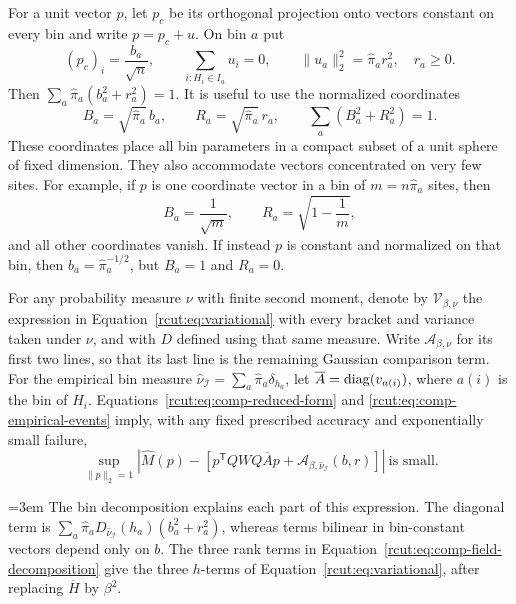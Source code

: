 For a unit vector $p$, let $p_c$ be its orthogonal projection onto
vectors constant on every bin and write $p=p_c+u$.  On bin $a$ put
\begin{equation}
 (p_c)_i=\frac{b_a}{\sqrt n},\qquad
 \sum_{i:H_i\in I_a}u_i=0,\qquad
 \|u_a\|_2^2=\widehat\pi_a r_a^2,
 \quad r_a\ge0.
 \label{rcut:eq:comp-bin-decomposition}
\end{equation}
Then
$\sum_a\widehat\pi_a(b_a^2+r_a^2)=1$.
It is useful to use the normalized coordinates
\begin{equation}
 B_a=\sqrt{\widehat\pi_a}\,b_a,
 \qquad R_a=\sqrt{\widehat\pi_a}\,r_a,
 \qquad \sum_a(B_a^2+R_a^2)=1.
 \label{rcut:eq:comp-normalized-parameters}
\end{equation}
These coordinates place all bin parameters in a compact subset of a
unit sphere of fixed dimension.  They also accommodate vectors
concentrated on very few sites.  For example, if $p$ is one coordinate
vector in a bin of $m=n\widehat\pi_a$ sites, then
\[
 B_a=\frac1{\sqrt m},\qquad R_a=\sqrt{1-\frac1m},
\]
and all other coordinates vanish.  If instead $p$ is constant and
normalized on that bin, then $b_a=\widehat\pi_a^{-1/2}$, but
$B_a=1$ and $R_a=0$.

For any probability measure $\nu$ with finite second moment, denote
by $\mathcal V_{\beta,\nu}$ the expression in
Equation~\eqref{rcut:eq:variational} with every bracket and variance
taken under $\nu$, and with $D$ defined using that same measure.
Write $\mathcal A_{\beta,\nu}$ for its first two lines, so that its
last line is the remaining Gaussian comparison term.
For the empirical bin measure
$\widehat\nu_{\mathcal I}=\sum_a\widehat\pi_a\delta_{h_a}$,
let $\overline A=\operatorname{diag}(v_{a(i)})$, where $a(i)$ is the bin of $H_i$.
Equations~\eqref{rcut:eq:comp-reduced-form} and
\eqref{rcut:eq:comp-empirical-events} imply, with any fixed prescribed
accuracy and exponentially small failure,
\begin{equation}
 \sup_{\|p\|_2=1}
 \left|\widehat M(p)-
   \left[p^{\mathsf T}QWQ\overline A p
       +\mathcal A_{\beta,\widehat\nu_{\mathcal I}}(b,r)\right]
 \right|\ \text{is small}.
 \label{rcut:eq:comp-bin-form-error}
\end{equation}
{\emergencystretch=3em
The bin decomposition explains each part of this expression.
The diagonal term is
$\sum_a\widehat\pi_aD_{\widehat\nu_{\mathcal I}}(h_a)(b_a^2+r_a^2)$,
whereas terms bilinear in bin-constant vectors depend only on $b$.
The three rank terms in
Equation~\eqref{rcut:eq:comp-field-decomposition} give the three
$h$-terms of Equation~\eqref{rcut:eq:variational}, after replacing
$\overline H$ by $\beta^2$.\par}

